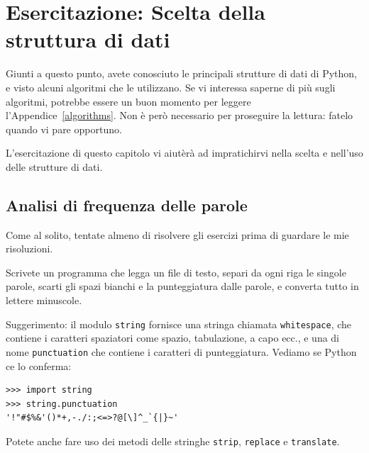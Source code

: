 \documentclass[10pt]{book}
\begin{document}
\chapter{Esercitazione: Scelta della struttura di dati}

Giunti a questo punto, avete conosciuto le principali strutture di dati di Python, e visto alcuni algoritmi che le utilizzano. Se vi interessa saperne di più sugli algoritmi, potrebbe essere un buon momento per leggere l'Appendice~\ref{algorithms}.
Non è però necessario per proseguire la lettura: fatelo quando vi pare opportuno.

L'esercitazione di questo capitolo vi aiutèrà ad impratichirvi nella scelta e nell'uso delle strutture di dati.

\section{Analisi di frequenza delle parole}
\label{analysis}

Come al solito, tentate almeno di risolvere gli esercizi prima di guardare le mie risoluzioni.

\vspace{0.2in}
\begin{exercise}

Scrivete un programma che legga un file di testo, separi da ogni riga le singole parole, scarti gli spazi bianchi e la punteggiatura dalle parole, e converta tutto in lettere minuscole.

Suggerimento: il modulo {\tt string} fornisce una stringa chiamata {\tt whitespace}, che contiene i caratteri spaziatori come spazio, tabulazione, a capo ecc., e una di nome {\tt punctuation} che contiene i caratteri di punteggiatura. Vediamo se Python ce lo conferma:

\begin{verbatim}
>>> import string
>>> string.punctuation
'!"#$%&'()*+,-./:;<=>?@[\]^_`{|}~'
\end{verbatim}
%
Potete anche fare uso dei metodi delle stringhe {\tt strip},
{\tt replace} e {\tt translate}.

\end{exercise}
\end{document}
